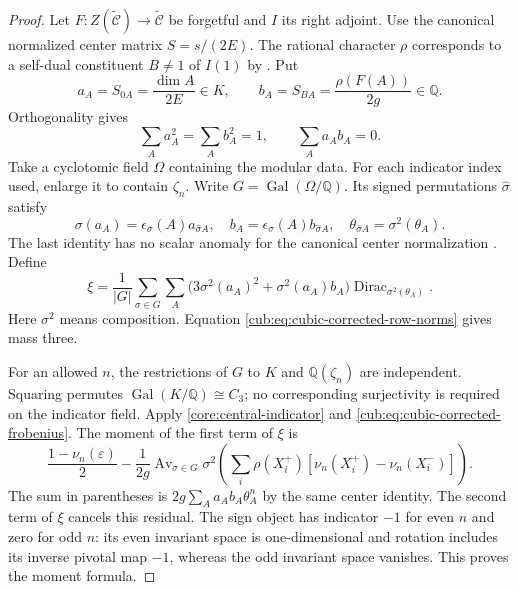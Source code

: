 \documentclass[11pt,a4paper]{article}
\theoremstyle{definition}\newtheorem{definition}[theorem]{Definition}
\theoremstyle{remark}\newtheorem{remark}[theorem]{Remark}
\newcommand{\C}{\mathcal C}
\newcommand{\Q}{\mathbb Q}
\numberwithin{equation}{section}
\begin{document}
\begin{proof}
Let $F:Z(\widetilde{\C})\to\widetilde{\C}$ be forgetful
and $I$ its right adjoint. Use the canonical normalized center matrix
$S=s/(2E)$. The rational character $\rho$ corresponds to a self-dual
constituent $B\ne1$ of $I(1)$ by
\cite[Example~2.9 and Theorem~2.13]{Ostrik3}. Put
\[
 a_A=S_{0A}=\frac{\dim A}{2E}\in K,\qquad
 b_A=S_{BA}=\frac{\rho(F(A))}{2g}\in\Q.
\]
Orthogonality gives
\begin{equation}\label{cub:eq:cubic-corrected-row-norms}
 \sum_Aa_A^2=\sum_Ab_A^2=1,\qquad \sum_Aa_Ab_A=0.
\end{equation}
Take a cyclotomic field $\Omega$ containing the modular data. For each
indicator index used, enlarge it to contain $\zeta_n$. Write
$G=\operatorname{Gal}(\Omega/\Q)$. Its signed permutations
$\widehat\sigma$ satisfy
\begin{equation}\label{cub:eq:cubic-corrected-galois}
 \sigma(a_A)=\epsilon_\sigma(A)a_{\widehat\sigma A},\quad
 b_A=\epsilon_\sigma(A)b_{\widehat\sigma A},\quad
 \theta_{\widehat\sigma A}=\sigma^2(\theta_A).
\end{equation}
The last identity has no scalar anomaly for the canonical center
normalization \cite[Lemma~4.2 and Section~4.1]{DLN}. Define
\[
 \xi=\frac1{|G|}\sum_{\sigma\in G}\sum_A
 \bigl(3\sigma^2(a_A)^2+\sigma^2(a_A)b_A\bigr)
 \operatorname{Dirac}_{\sigma^2(\theta_A)}.
\]
Here $\sigma^2$ means composition. Equation
\eqref{cub:eq:cubic-corrected-row-norms} gives mass three.

For an allowed $n$, the restrictions of $G$ to $K$ and
$\Q(\zeta_n)$ are independent. Squaring permutes
$\operatorname{Gal}(K/\Q)\cong C_3$; no corresponding
surjectivity is required on the indicator field.
Apply \eqref{core:central-indicator} and
\eqref{cub:eq:cubic-corrected-frobenius}. The moment of the first
term of $\xi$ is
\[
 \frac{1-\nu_n(\varepsilon)}2
 -\frac1{2g}\operatorname{Av}_{\sigma\in G}
 \sigma^2\!\left(\sum_i\rho(X_i^+)
          [\nu_n(X_i^+)-\nu_n(X_i^-)]\right).
\]
The sum in parentheses is $2g\sum_Aa_Ab_A\theta_A^n$ by the same
center identity. The second term of $\xi$ cancels this residual.
The sign object has indicator $-1$ for even $n$ and zero for odd $n$:
its even invariant space is one-dimensional and rotation includes its
inverse pivotal map $-1$, whereas the odd invariant space vanishes.
This proves the moment formula.


\end{proof}
\end{document}

